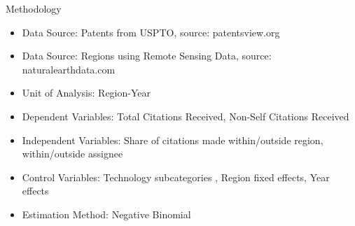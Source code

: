 \documentclass{beamer}
\begin{document}
\begin{frame}{Methodology}{}
\begin{itemize}
\item{Data Source: Patents from USPTO, source: patentsview.org}
\item{Data Source: Regions using Remote Sensing Data, source: naturalearthdata.com}
\item{Unit of Analysis: Region-Year}
\item{Dependent Variables: Total Citations Received, Non-Self Citations Received}
\item{Independent Variables: Share of citations made within/outside region, within/outside assignee}
\item{Control Variables: Technology subcategories \citep*{Hall2001a}, Region fixed effects, Year effects}
\item{Estimation Method: Negative Binomial}
\end{itemize}
\end{frame}
\end{document}
